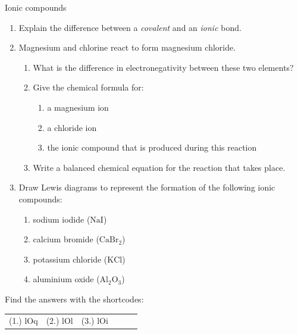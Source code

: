             \begin{exercises}{Ionic compounds
        }
            \nopagebreak
        \label{m38684*id142562}\begin{enumerate}[noitemsep, label=\textbf{\arabic*}. ] 
            \label{m38684*uid57}\item Explain the difference between a \textsl{covalent} and an \textsl{ionic} bond.\newline
\label{m38684*uid58}\item Magnesium and chlorine react to form magnesium chloride.
\label{m38684*id142602}\begin{enumerate}[noitemsep, label=\textbf{\alph*}. ] 
            \label{m38684*uid59}\item What is the difference in electronegativity between these two elements?
\label{m38684*uid60}\item Give the chemical formula for:
\label{m38684*id142630}\begin{enumerate}[noitemsep, label=\textbf{\roman*}. ] 
            \label{m38684*uid61}\item a magnesium ion
\label{m38684*uid62}\item a chloride ion
\label{m38684*uid63}\item the ionic compound that is produced during this reaction
\end{enumerate}
        \label{m38684*uid64}\item Write a balanced chemical equation for the reaction that takes place.
\end{enumerate}
        \label{m38684*uid65}\item Draw Lewis diagrams to represent the formation of the following ionic compounds:
\label{m38684*id142697}\begin{enumerate}[noitemsep, label=\textbf{\alph*}. ] 
            \label{m38684*uid66}\item sodium iodide ($\text{NaI}$)
\label{m38684*uid67}\item calcium bromide ($\text{CaBr}{}_{2}$)
\label{m38684*uid68}\item potassium chloride ($\text{KCl}$)
\item aluminium oxide ($\text{Al}_{2}\text{O}_{3}$)
\end{enumerate}
        \end{enumerate}
      \label{m38684*uid69}
\par {} Find the answers with the shortcodes:
 \par \begin{tabular}[h]{cccccc}
 (1.) lOq  &  (2.) lOl  &  (3.) lOi  & \end{tabular}
\end{exercises}

